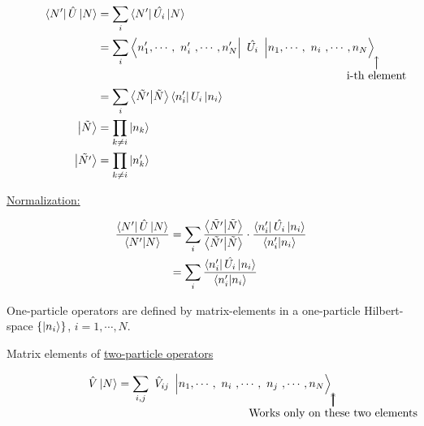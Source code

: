 \begin{align}
	\bra{N'} \hat{U}\ket{N} &= \sum_i  \bra{N'} \hat{U_i}\ket{N} \nonumber \\
	&= \sum_i \bra{n'_1, \cdots, \tikzmark{node1}{n'_i}, \cdots, n'_N}\tikzmark{node2}{\hat{U_i}} \ket{n_1, \cdots, \tikzmark{node3}{n_i},\cdots, n_N} \nonumber
	\begin{tikzpicture}[overlay, remember picture,node distance =1.5cm]
		\draw[->,black] (node2) .. controls +(down:1.2cm) and +(right:0cm) .. node[below] {i-th element} (node3.south);
	\end{tikzpicture}\\
	\nonumber \\
	&= \sum_i \bra{\tilde{N'}}\ket{\tilde{N}} \bra{n'_i} U_i \ket{n_i}\\
	\ket{\tilde{N}} &= \prod_{k \neq i} \ket{n_k} \nonumber \\
	\ket{\tilde{N'}} &= \prod_{k \neq i} \ket{n'_k} \nonumber
\end{align}

\noindent \uline{Normalization:}

\begin{align}
	\frac{\bra{N'} \hat{U} \ket{N}}{\braket{N'}{N}} &= \sum_i \frac{\bra{\tilde{N'}} \ket{\tilde{N}}}{\braket{\tilde{N'}}{\tilde{N}}} \cdot \frac{\bra{n'_i} \hat{U_i} \ket{n_i}}{{\braket{n'_i}{n_i}}} \nonumber \\
	&= \sum_i \frac{\bra{n'_i} \hat{U_i} \ket{n_i}}{\braket{n'_i}{n_i}}
\end{align}


\begin{tcolorbox}
	One-particle operators are defined by matrix-elements in a one-particle Hilbert-space $\{\ket{n_i}\}$, ${i=1,\cdots,N}$.
\end{tcolorbox}

\noindent Matrix elements of \uline{two-particle operators}

\begin{equation}
	\hat{V} \ket{N}= \sum_{i,j} \tikzmark{node1}{\hat{V}_{ij}} \ket{n_1, \cdots , \tikzmark{node2}{n_i}, \cdots, \tikzmark{node3}{n_j}, \cdots, n_N}
	\begin{tikzpicture}[overlay, remember picture,node distance =1.5cm]
		\draw[->,black] (node1) .. controls +(down:1.2cm) and +(right:0cm) .. node[below] {} (node2.south);
		\draw[->,black] (node1) .. controls +(down:1.2cm) and +(right:0cm) .. node[below] {Works only on these two elements} (node3.south);
	\end{tikzpicture}\\
\end{equation}\\
\linebreak

